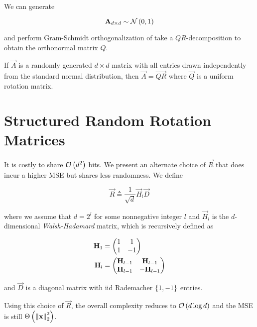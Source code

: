 \documentclass[twoside]{article}
\begin{document}
We can generate

\begin{equation}
    \boldsymbol{\mathbf{A}}_{d\times d} \sim \mathcal N\left(0,1\right)
    \label{eq:A-def}
\end{equation}

and perform Gram-Schmidt orthogonalization of take a \(QR\)-decomposition to 
obtain the orthonormal matrix \(Q\).

\begin{lemma}
    If \(\vec{A}\) is a randomly generated \(d\times d\) matrix with all 
    entries drawn independently from the standard normal distribution, then
    \(\vec{A}=\vec{QR}\) where \(\vec{Q}\) is a uniform rotation matrix.
\end{lemma}

\section{Structured Random Rotation Matrices}

It is costly to share \(\mathcal O\left(d^2\right)\) bits. We present an alternate choice of
\(\vec{R}\) that does incur a higher MSE but shares less randomness. We define

\begin{equation}
\vec{R} \triangleq \frac{1}{\sqrt{d}}\vec{H}_l\vec{D}
    \label{eq:r-alt-def}
\end{equation}

where we assume that \(d = 2^l\) for some nonnegative integer \(l\) and \(\vec{H}_l\)
is the \(d\)-dimensional \emph{Walsh-Hadamard} matrix, which is recursively defined
as

\begin{align}
    \boldsymbol{\mathbf{H}}_1 &= \begin{pmatrix}1 & 1 \\ 1 & -1\end{pmatrix} \\
    \boldsymbol{\mathbf{H}}_l &= \begin{pmatrix}\boldsymbol{\mathbf{H}}_{l-1} & \boldsymbol{\mathbf{H}}_{l-1} \\ \boldsymbol{\mathbf{H}}_{l-1} & -\boldsymbol{\mathbf{H}}_{l-1}\end{pmatrix}
    \label{eq:wh-def}
\end{align}

and \(\vec{D}\) is a diagonal matrix with iid Rademacher \(\left\{1,-1\right\}\) entries.

Using this choice of \(\vec{R}\), the overall complexity reduces to \(\mathcal O\left(d\log{d}\right)\) and the MSE is still \(\Theta\left(\left\lVert\boldsymbol{\mathbf{x}}\right\rVert_2^2\right)\).
\end{document}
